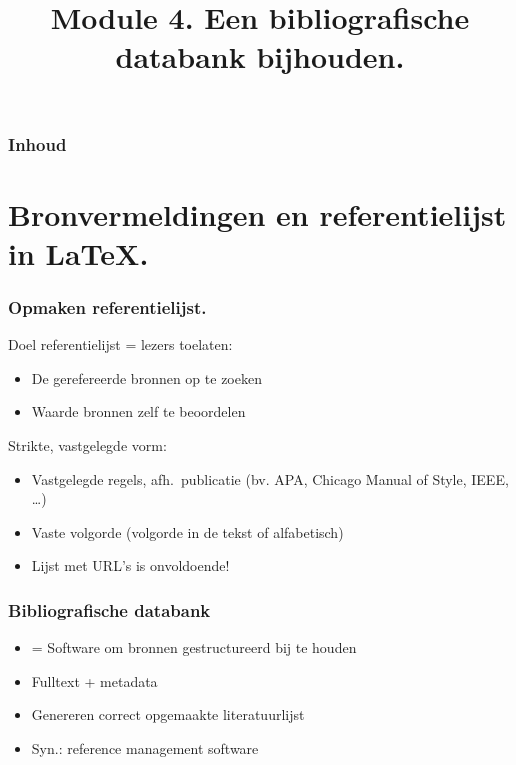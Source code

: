 \documentclass[aspectratio=169]{beamer}
\title{Module 4. Een bibliografische databank bijhouden.}
\subtitle{\coursename}
\author{\lecturers}   %
\date{\academicyear}
\begin{document}
\begin{frame}
  \maketitle
\end{frame}

\begin{frame}
  \frametitle{Inhoud}

  \tableofcontents
\end{frame}

\section{Bronvermeldingen en referentielijst in {\LaTeX}.}

\begin{frame}[plain]
  \frametitle{Opmaken referentielijst.}

  Doel referentielijst = lezers toelaten:

  \begin{itemize}
    \item De gerefereerde bronnen op te zoeken
    \item Waarde bronnen zelf te beoordelen
  \end{itemize}

  {\pause}

  Strikte, vastgelegde vorm:

  \begin{itemize}
    \item Vastgelegde regels, afh.~publicatie (bv. APA, Chicago Manual of Style, IEEE, \ldots)
    \item Vaste volgorde (volgorde in de tekst of alfabetisch)
    \item Lijst met URL's is onvoldoende!
  \end{itemize}

  {\pause}

\end{frame}

\begin{frame}
  \frametitle{Bibliografische databank}

  \begin{itemize}
    \item = Software om bronnen gestructureerd bij te houden
    \item Fulltext + metadata
    \item Genereren correct opgemaakte literatuurlijst
    \item Syn.: reference management software
  \end{itemize}

\end{frame}
\end{document}
